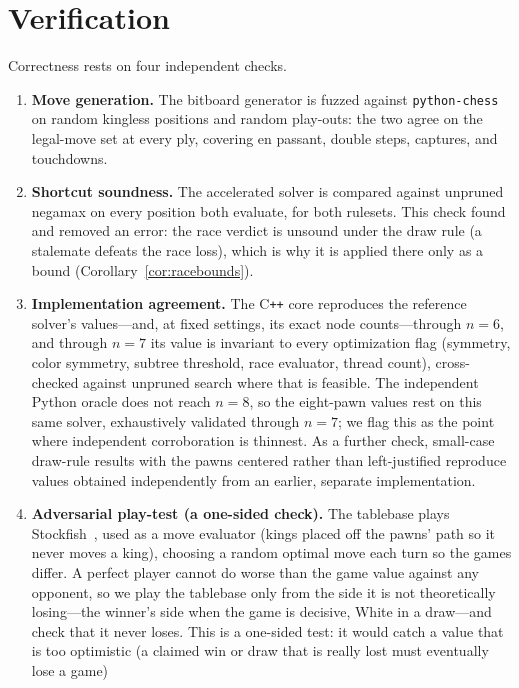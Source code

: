 \documentclass[Afour,sageapa,times]{sagej}
\theoremstyle{plain}
\theoremstyle{definition}
\begin{document}
\section{Verification}\label{sec:verify}

Correctness rests on four independent checks.

\begin{enumerate}
  \item \textbf{Move generation.} The bitboard generator is fuzzed against
  \texttt{python-chess} on random kingless positions and random play-outs: the
  two agree on the legal-move set at every ply, covering en passant, double
  steps, captures, and touchdowns.
  \item \textbf{Shortcut soundness.} The accelerated solver is compared against
  unpruned negamax on every position both evaluate, for both rulesets. This
  check found and removed an error: the race verdict is unsound under the draw
  rule (a stalemate defeats the race loss), which is why it is applied there only
  as a bound (Corollary~\ref{cor:racebounds}).
  \item \textbf{Implementation agreement.} The C\texttt{++} core reproduces the
  reference solver's values---and, at fixed settings, its exact node counts---through
  $n=6$, and through $n=7$ its value is invariant to every optimization flag
  (symmetry, color symmetry, subtree threshold, race evaluator, thread count),
  cross-checked against unpruned search where that is feasible. The independent
  Python oracle does not reach $n=8$, so the eight-pawn values rest on this same
  solver, exhaustively validated through $n=7$; we flag this as the point where
  independent corroboration is thinnest. As a further check, small-case draw-rule
  results with the pawns centered rather than left-justified reproduce values
  obtained independently from an earlier, separate implementation.
  \item \textbf{Adversarial play-test (a one-sided check).} The tablebase plays
  Stockfish~\cite{stockfish}, used as a move evaluator (kings placed off the pawns'
  path so it never moves a king), choosing a random optimal move each turn so the
  games differ. A perfect player cannot do worse than the game value against any
  opponent, so we play the tablebase only from the side it is not theoretically
  losing---the winner's side when the game is decisive, White in a draw---and check
  that it never loses. This is a one-sided test: it would catch a value that is too
  optimistic (a claimed win or draw that is really lost must eventually lose a game)

\end{enumerate}
\end{document}

